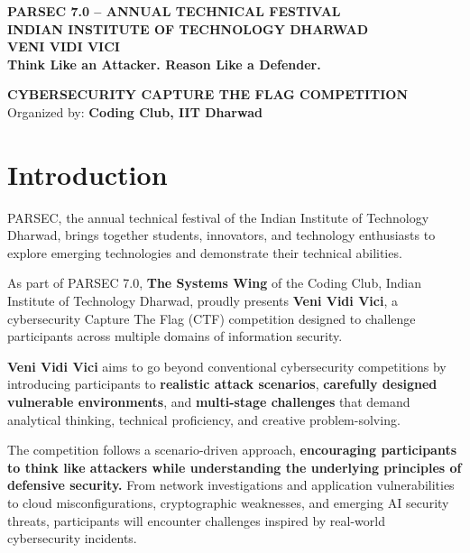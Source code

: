 \documentclass[11pt,a4paper]{article}
\begin{document}
\begin{center}
    {\large\bfseries\color{VVVGray} PARSEC 7.0 -- ANNUAL TECHNICAL FESTIVAL}\\[3pt]
    {\large\bfseries\color{VVVGray} INDIAN INSTITUTE OF TECHNOLOGY DHARWAD}\\[22pt]

    {\Huge\bfseries\color{VVVNavy} VENI VIDI VICI}\\[7pt]
    {\Large\bfseries\color{VVVCyan} Think Like an Attacker. Reason Like a Defender.}\\[16pt]

    \colorbox{VVVLight}{%
        \parbox{0.88\textwidth}{%
            \centering
            \vspace{7pt}
            \textbf{CYBERSECURITY CAPTURE THE FLAG COMPETITION}\\
            Organized by: \textbf{Coding Club, IIT Dharwad}
            \vspace{7pt}
        }%
    }
\end{center}

\vspace{10pt}

\section{Introduction}

PARSEC, the annual technical festival of the Indian Institute of Technology Dharwad,
brings together students, innovators, and technology enthusiasts to explore emerging
technologies and demonstrate their technical abilities.

As part of PARSEC 7.0, \textbf{The Systems Wing} of the Coding Club, Indian Institute of Technology Dharwad, proudly presents
\textbf{Veni Vidi Vici}, a cybersecurity Capture The Flag (CTF) competition designed
to challenge participants across multiple domains of information security.

\textbf{Veni Vidi Vici} aims to go beyond conventional cybersecurity competitions by
introducing participants to \textbf{realistic attack scenarios}, \textbf{carefully designed vulnerable
environments}, and \textbf{multi-stage challenges} that demand analytical thinking, technical
proficiency, and creative problem-solving.

The competition follows a scenario-driven approach, \textbf{encouraging participants to
think like attackers while understanding the underlying principles of defensive
security.} From network investigations and application vulnerabilities to cloud
misconfigurations, cryptographic weaknesses, and emerging AI security threats,
participants will encounter challenges inspired by real-world cybersecurity incidents.
\end{document}
